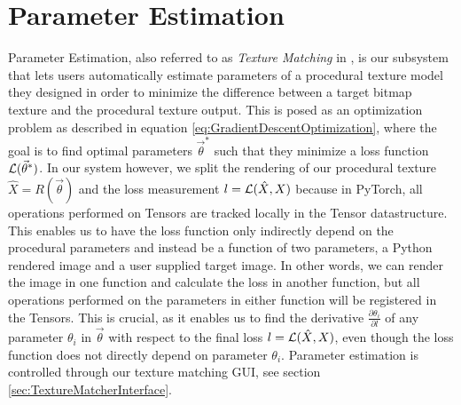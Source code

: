 



\section{Parameter Estimation}

Parameter Estimation, also referred to as \textit{Texture Matching} in \dipter{}, is our subsystem that lets users automatically estimate parameters of a procedural texture model they designed in order to minimize the difference between a target bitmap texture and the procedural texture output. This is posed as an optimization problem as described in equation \ref{eq:GradientDescentOptimization}, where the goal is to find optimal parameters $\Vec{\theta}^*$ such that they minimize a loss function $\operatorname{\mathcal{L}}(\Vec{\theta}^*)$. In our system however, we split the rendering of our procedural texture $\hat{X} = R(\vec{\theta})$ and the loss measurement $l=\operatorname{\mathcal{L}}(\hat{X},X)$ because in PyTorch, all operations performed on Tensors are tracked locally in the Tensor datastructure. This enables us to have the loss function only indirectly depend on the procedural parameters and instead be a function of two parameters, a Python rendered image and a user supplied target image. In other words, we can render the image in one function and calculate the loss in another function, but all operations performed on the parameters in either function will be registered in the Tensors. This is crucial, as it enables us to find the derivative $\frac{\partial \theta_i}{\partial l}$ of any parameter $\theta_i$ in $\vec{\theta}$ with respect to the final loss $l = \operatorname{\mathcal{L}}(\hat{X}, X)$, even though the loss function does not directly depend on parameter $\theta_i$. Parameter estimation is controlled through our texture matching GUI, see section \ref{sec:TextureMatcherInterface}.

